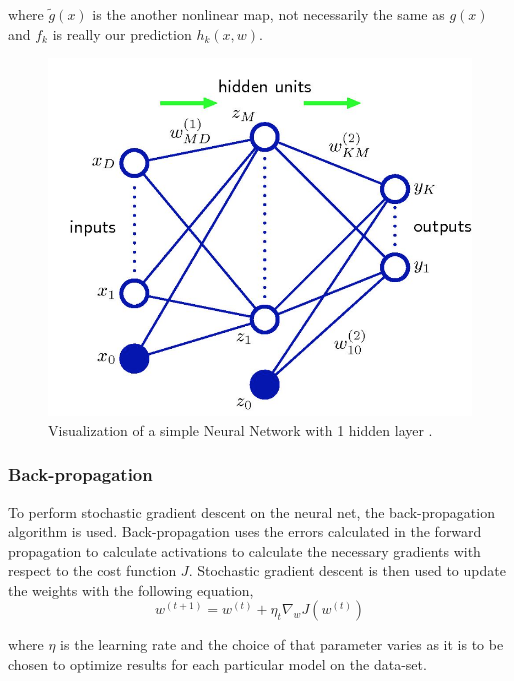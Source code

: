 \documentclass[12pt, twocolumn]{article}
\begin{document}
where $\tilde{g}(x)$ is the  another nonlinear map, not necessarily the same as $g(x)$ and $f_k$ is really our prediction $h_k(x,w)$. 

\begin{figure}
\includegraphics[scale=.6]{simpleNN.png}

\caption{Visualization of a simple Neural Network with 1 hidden layer \cite{Bishop} . }
\label{fig:basicNN}
\end{figure}






\subsubsection{Back-propagation}

To perform stochastic gradient descent on the neural net, the back-propagation algorithm is used. Back-propagation uses the errors calculated in the forward propagation to calculate activations to calculate the necessary gradients with respect to the cost function $J$. Stochastic gradient descent is then used to update the weights with the following equation, 
\begin{equation}
w^{(t+1)} = w^{(t)} + \eta_t \nabla_w J(w^{(t)})
\end{equation}

where $\eta$ is  the learning rate and the choice of that parameter varies as it is to be chosen to optimize results for each particular model on the data-set.
\end{document}
